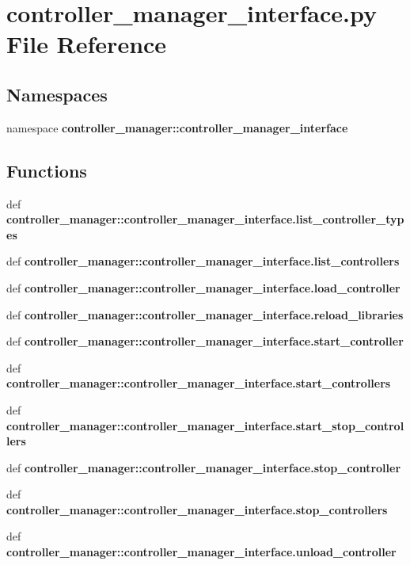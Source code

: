 \section{controller\-\_\-manager\-\_\-interface.\-py \-File \-Reference}
\label{controller__manager__interface_8py}
\subsection*{\-Namespaces}
\begin{DoxyCompactItemize}
\item 
namespace {\bf controller\-\_\-manager\-::controller\-\_\-manager\-\_\-interface}
\end{DoxyCompactItemize}
\subsection*{\-Functions}
\begin{DoxyCompactItemize}
\item 
def {\bf controller\-\_\-manager\-::controller\-\_\-manager\-\_\-interface.\-list\-\_\-controller\-\_\-types}
\item 
def {\bf controller\-\_\-manager\-::controller\-\_\-manager\-\_\-interface.\-list\-\_\-controllers}
\item 
def {\bf controller\-\_\-manager\-::controller\-\_\-manager\-\_\-interface.\-load\-\_\-controller}
\item 
def {\bf controller\-\_\-manager\-::controller\-\_\-manager\-\_\-interface.\-reload\-\_\-libraries}
\item 
def {\bf controller\-\_\-manager\-::controller\-\_\-manager\-\_\-interface.\-start\-\_\-controller}
\item 
def {\bf controller\-\_\-manager\-::controller\-\_\-manager\-\_\-interface.\-start\-\_\-controllers}
\item 
def {\bf controller\-\_\-manager\-::controller\-\_\-manager\-\_\-interface.\-start\-\_\-stop\-\_\-controllers}
\item 
def {\bf controller\-\_\-manager\-::controller\-\_\-manager\-\_\-interface.\-stop\-\_\-controller}
\item 
def {\bf controller\-\_\-manager\-::controller\-\_\-manager\-\_\-interface.\-stop\-\_\-controllers}
\item 
def {\bf controller\-\_\-manager\-::controller\-\_\-manager\-\_\-interface.\-unload\-\_\-controller}
\end{DoxyCompactItemize}
